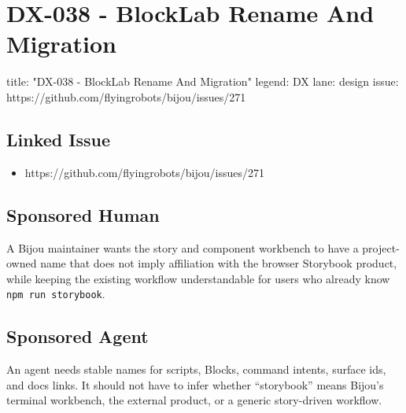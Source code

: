 \chapter{DX-038 - BlockLab Rename And Migration}\label{record-134}

\smallskip

\begin{RecordMeta}
title: "DX-038 - BlockLab Rename And Migration"
legend: DX
lane: design
issue: https://github.com/flyingrobots/bijou/issues/271

\end{RecordMeta}

\section{Linked Issue}\label{record-134-linked-issue}

\begin{itemize}
\tightlist
\item
  https://github.com/flyingrobots/bijou/issues/271
\end{itemize}

\section{Sponsored Human}\label{record-134-sponsored-human}

A Bijou maintainer wants the story and component workbench to have a project-owned name that does not imply affiliation with the browser Storybook product, while keeping the existing workflow understandable for users who already know \texttt{n\allowbreak{}p\allowbreak{}m\allowbreak{} \allowbreak{}r\allowbreak{}u\allowbreak{}n\allowbreak{} \allowbreak{}s\allowbreak{}t\allowbreak{}o\allowbreak{}r\allowbreak{}y\allowbreak{}b\allowbreak{}o\allowbreak{}o\allowbreak{}k}.

\section{Sponsored Agent}\label{record-134-sponsored-agent}

An agent needs stable names for scripts, Blocks, command intents, surface ids, and docs links. It should not have to infer whether ``storybook'' means Bijou's terminal workbench, the external product, or a generic story-driven workflow.

